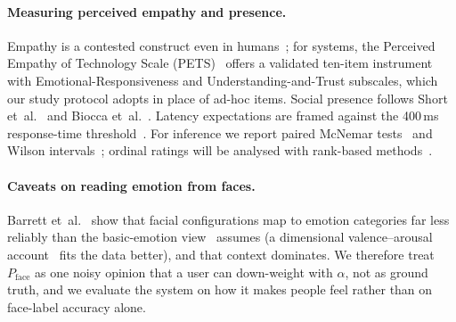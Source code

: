 \documentclass[sigconf,nonacm]{acmart}
\begin{document}
  \paragraph{Measuring perceived empathy and presence.} Empathy is a contested construct even in humans~\cite{cuff2016empathy}; for systems, the Perceived Empathy of Technology Scale (PETS)~\cite{schmidmaier2024pets} offers a validated ten-item instrument with Emotional-Responsiveness and Understanding-and-Trust subscales, which our study protocol adopts in place of ad-hoc items. Social presence follows Short et~al.~\cite{short1976social} and Biocca et~al.~\cite{biocca2003social}. Latency expectations are framed against the 400\,ms response-time threshold~\cite{doherty1982economic,card1983human}. For inference we report paired McNemar tests~\cite{mcnemar1947note} and Wilson intervals~\cite{wilson1927probable}; ordinal ratings will be analysed with rank-based methods~\cite{wobbrock2011art}.

  \paragraph{Caveats on reading emotion from faces.} Barrett et~al.~\cite{barrett2019emotional} show that facial configurations map to emotion categories far less reliably than the basic-emotion view~\cite{ekman1971universals} assumes (a dimensional valence--arousal account~\cite{russell1980circumplex} fits the data better), and that context dominates. We therefore treat $P_\text{face}$ as one noisy opinion that a user can down-weight with $\alpha$, not as ground truth, and we evaluate the system on how it makes people feel rather than on face-label accuracy alone.
\end{document}
